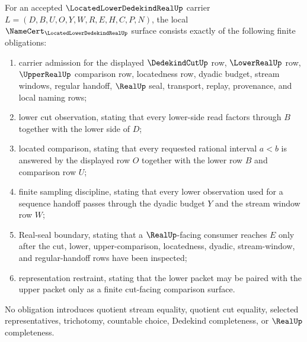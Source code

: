 \begin{theorem}
\label{thm:located-lower-dedekind-real-namecert-obligations}
For an accepted $\LocatedLowerDedekindRealUp$ carrier $L=(D,B,U,O,Y,W,R,E,H,C,P,N)$, the local $\NameCert_{\LocatedLowerDedekindRealUp}$ surface consists exactly of the following finite obligations:
\begin{enumerate}
\item carrier admission for the displayed $\DedekindCutUp$ row, $\LowerRealUp$ row, $\UpperRealUp$ comparison row, locatedness row, dyadic budget, stream windows, regular handoff, $\RealUp$ seal, transport, replay, provenance, and local naming rows;
\item lower cut observation, stating that every lower-side read factors through $B$ together with the lower side of $D$;
\item located comparison, stating that every requested rational interval $a<b$ is answered by the displayed row $O$ together with the lower row $B$ and comparison row $U$;
\item finite sampling discipline, stating that every lower observation used for a sequence handoff passes through the dyadic budget $Y$ and the stream window row $W$;
\item Real-seal boundary, stating that a $\RealUp$-facing consumer reaches $E$ only after the cut, lower, upper-comparison, locatedness, dyadic, stream-window, and regular-handoff rows have been inspected;
\item representation restraint, stating that the lower packet may be paired with the upper packet only as a finite cut-facing comparison surface.
\end{enumerate}
No obligation introduces quotient stream equality, quotient cut equality, selected representatives, trichotomy, countable choice, Dedekind completeness, or $\RealUp$ completeness.
\end{theorem}
